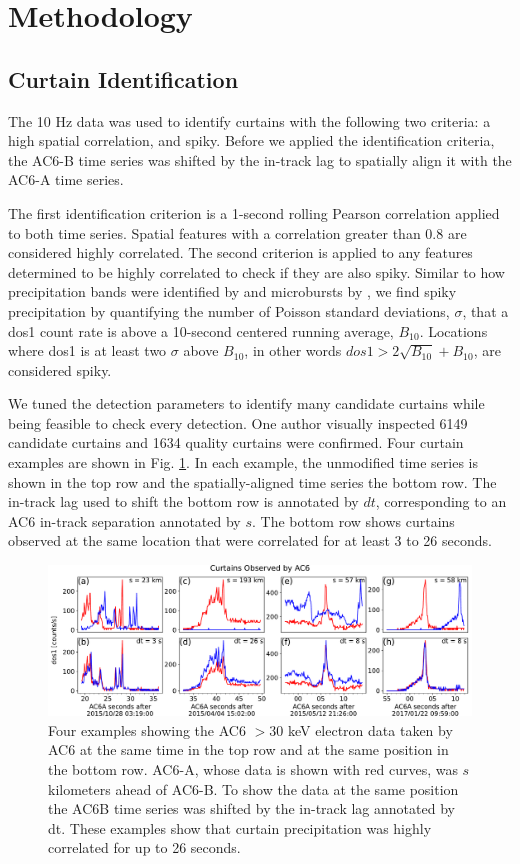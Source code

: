 \documentclass[draft]{agujournal2019}
\begin{document}
\section{Methodology} 
\subsection{Curtain Identification} \label{curtain_identification}
The 10 Hz data was used to identify curtains with the following two criteria: a high spatial correlation, and spiky. Before we applied the identification criteria, the AC6-B time series was shifted by the in-track lag to spatially align it with the AC6-A time series. 

The first identification criterion is a 1-second rolling Pearson correlation applied to both time series. Spatial features with a correlation greater than 0.8 are considered highly correlated. The second criterion is applied to any features determined to be highly correlated to check if they are also spiky. Similar to how precipitation bands were identified by  and microbursts by , we find spiky precipitation by quantifying the number of Poisson standard deviations, $\sigma$, that a dos1 count rate is above a 10-second centered running average, $B_{10}$. Locations where dos1 is at least two $\sigma$ above $B_{10}$, in other words $dos1 > 2\sqrt{B_{10}} + B_{10}$, are considered spiky. 

We tuned the detection parameters to identify many candidate curtains while being feasible to check every detection. One author visually inspected 6149 candidate curtains and 1634 quality curtains were confirmed. Four curtain examples are shown in Fig. \ref{fig1}. In each example, the unmodified time series is shown in the top row and the spatially-aligned time series the bottom row. The in-track lag used to shift the bottom row is annotated by $dt$, corresponding to an AC6 in-track separation annotated by $s$. The bottom row shows curtains observed at the same location that were correlated for at least 3 to 26 seconds.

\begin{figure}
\includegraphics[width=\textwidth]{fig1.pdf}
\caption{Four examples showing the AC6 $> 30$ keV electron data taken by AC6 at the same time in the top row and at the same position in the bottom row. AC6-A, whose data is shown with red curves, was $s$ kilometers ahead of AC6-B. To show the data at the same position the AC6B time series was shifted by the in-track lag annotated by dt. These examples show that curtain precipitation was highly correlated for up to 26 seconds.}
\label{fig1}
\end{figure}
\end{document}
